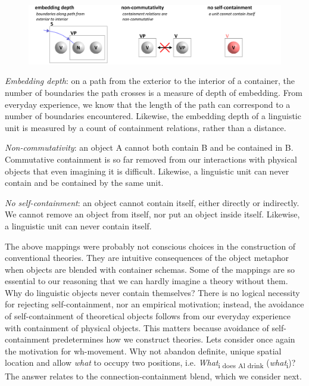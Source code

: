   
\begin{figure}
\includegraphics[width=\textwidth]{figures/Tilsen-img33.png}
\caption{\missingcaption}
\label{fig:3:5}
\end{figure}
 

\textit{Embedding depth}: on a path from the exterior to the interior of a container, the number of boundaries the path crosses is a measure of depth of embedding. From everyday experience, we know that the length of the path can correspond to a number of boundaries encountered. Likewise, the embedding depth of a linguistic unit is measured by a count of containment relations, rather than a distance.

\textit{Non-commutativity}: an object A cannot both contain B and be contained in B. Commutative containment is so far removed from our interactions with physical objects that even imagining it is difficult. Likewise, a linguistic unit can never contain and be contained by the same unit.

\textit{No self-containment}: an object cannot contain itself, either directly or indirectly. We cannot remove an object from itself, nor put an object inside itself. Likewise, a linguistic unit can never contain itself. 

  The above mappings were probably not conscious choices in the construction of conventional theories. They are intuitive consequences of the object metaphor when objects are blended with container schemas. Some of the mappings are so essential to our reasoning that we can hardly imagine a theory without them. Why do linguistic objects never contain themselves? There is no logical necessity for rejecting self-containment, nor an empirical motivation; instead, the avoidance of self-containment of theoretical objects follows from our everyday experience with containment of physical objects. This matters because avoidance of self-containment predetermines how we construct theories. Lets consider once again the motivation for wh-movement. Why not abandon definite, unique spatial location and allow \textit{what} to occupy two positions, i.e. \textit{What}\textsubscript{i does Al drink} (\textit{what}\textsubscript{i})? The answer relates to the connection-containment blend, which we consider next.


